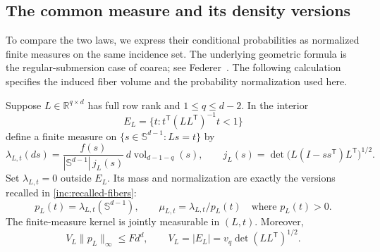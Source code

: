 \subsection{The common measure and its density versions}
\label{inc:common-measure}\label{inc:fibers}

To compare the two laws, we express their conditional probabilities as
normalized finite measures on the same incidence set.  The underlying
geometric formula is the regular-submersion case of coarea; see
Federer~\cite[Definition~2.10 and Theorem~3.1, pp.~423 and 426--427]{Federer1959}.
The following calculation specifies the induced fiber volume and the
probability normalization used here.

\begin{lemma}\label{inc:projection}
Suppose \(L\in\mathbb R^{q\times d}\) has full row rank and
\(1\le q\le d-2\).  In the interior
\[
 E_L=\{t:t^{\mathsf T}(LL^{\mathsf T})^{-1}t<1\}
\]
define a finite measure on \(\{s\in\mathbb S^{d-1}:Ls=t\}\) by
\begin{equation}\label{inc:fiber-measure}
 \lambda_{L,t}(ds)=
 \frac{f(s)}{|\mathbb S^{d-1}|\,j_L(s)}
 \,d\operatorname{vol}_{d-1-q}(s),\qquad
 j_L(s)=\det\!\bigl(L(I-ss^{\mathsf T})L^{\mathsf T}\bigr)^{1/2}.
\end{equation}
Set \(\lambda_{L,t}=0\) outside \(E_L\).  Its mass and normalization
are exactly the versions recalled in \eqref{inc:recalled-fibers}:
\[
 p_L(t)=\lambda_{L,t}(\mathbb S^{d-1}),\qquad
 \mu_{L,t}=\lambda_{L,t}/p_L(t)\quad\text{where }p_L(t)>0.
\]
The finite-measure kernel is jointly measurable in \((L,t)\).  Moreover,
\begin{equation}\label{inc:ellipsoid-bound}
 V_L\|p_L\|_\infty\le Fd^d,\qquad
 V_L=|E_L|=v_q\det(LL^{\mathsf T})^{1/2}.
\end{equation}
\end{lemma}

